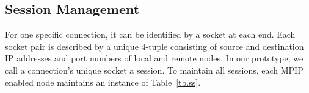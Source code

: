 %
%
%
%
%
%
%
%

%

\subsection{Session Management}
\label{sec:session}

For one specific connection, it can be identified by a socket at each end. Each socket pair is described by a unique $4$-tuple consisting of source and destination IP addresses and port numbers of local and remote nodes. In our prototype, we call a connection's unique socket a session. To maintain all sessions, each MPIP enabled node   
maintains an instance of Table~\ref{tb.ss}.

